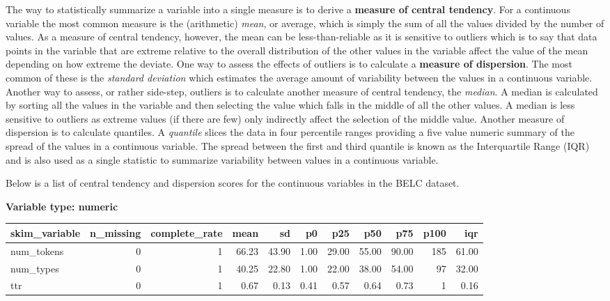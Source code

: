 \documentclass[
  letterpaper,
]{latex/krantz}
\begin{document}
The way to statistically summarize a variable into a single measure is
to derive a \textbf{measure of central tendency}. For a continuous
variable the most common measure is the (arithmetic) \emph{mean}, or
average, which is simply the sum of all the values divided by the number
of values. As a measure of central tendency, however, the mean can be
less-than-reliable as it is sensitive to outliers which is to say that
data points in the variable that are extreme relative to the overall
distribution of the other values in the variable affect the value of the
mean depending on how extreme the deviate. One way to assess the effects
of outliers is to calculate a \textbf{measure of dispersion}. The most
common of these is the \emph{standard deviation} which estimates the
average amount of variability between the values in a continuous
variable. Another way to assess, or rather side-step, outliers is to
calculate another measure of central tendency, the \emph{median}. A
median is calculated by sorting all the values in the variable and then
selecting the value which falls in the middle of all the other values. A
median is less sensitive to outliers as extreme values (if there are
few) only indirectly affect the selection of the middle value. Another
measure of dispersion is to calculate quantiles. A \emph{quantile}
slices the data in four percentile ranges providing a five value numeric
summary of the spread of the values in a continuous variable. The spread
between the first and third quantile is known as the Interquartile Range
(IQR) and is also used as a single statistic to summarize variability
between values in a continuous variable.

Below is a list of central tendency and dispersion scores for the
continuous variables in the BELC dataset.

\textbf{Variable type: numeric}

\begin{tabular}{l|r|r|r|r|r|r|r|r|r|r}
\hline
skim\_variable & n\_missing & complete\_rate & mean & sd & p0 & p25 & p50 & p75 & p100 & iqr\\
\hline
num\_tokens & 0 & 1 & 66.23 & 43.90 & 1.00 & 29.00 & 55.00 & 90.00 & 185 & 61.00\\
\hline
num\_types & 0 & 1 & 40.25 & 22.80 & 1.00 & 22.00 & 38.00 & 54.00 & 97 & 32.00\\
\hline
ttr & 0 & 1 & 0.67 & 0.13 & 0.41 & 0.57 & 0.64 & 0.73 & 1 & 0.16\\
\hline
\end{tabular}
\end{document}
